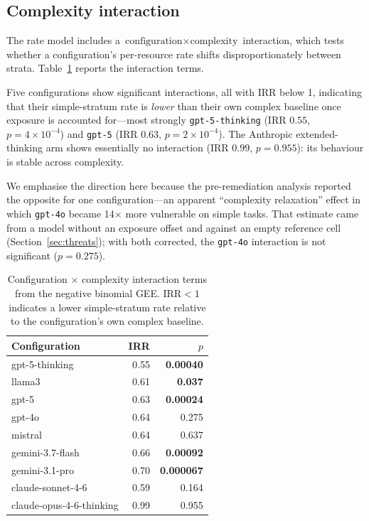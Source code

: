 \documentclass[conference]{IEEEtran}
\begin{document}
\subsection{Complexity interaction}
\label{sec:interaction}
The rate model includes a $\text{configuration}\times\text{complexity}$
interaction, which tests whether a configuration's per-resource rate shifts
disproportionately between strata. Table~\ref{tab:interaction} reports the
interaction terms.

Five configurations show significant interactions, all with IRR below 1,
indicating that their simple-stratum rate is \emph{lower} than their own complex
baseline once exposure is accounted for---most strongly \texttt{gpt-5-thinking}
(IRR $0.55$, $p=4\times10^{-4}$) and \texttt{gpt-5} (IRR $0.63$,
$p=2\times10^{-4}$). The Anthropic extended-thinking arm shows essentially no
interaction (IRR $0.99$, $p=0.955$): its behaviour is stable across complexity.

We emphasise the direction here because the pre-remediation analysis reported the
opposite for one configuration---an apparent ``complexity relaxation'' effect in
which \texttt{gpt-4o} became 14$\times$ more vulnerable on simple tasks. That
estimate came from a model without an exposure offset and against an empty
reference cell (Section~\ref{sec:threats}); with both corrected, the
\texttt{gpt-4o} interaction is not significant ($p=0.275$).

\begin{table}[t]
\caption{Configuration $\times$ complexity interaction terms from the negative
binomial GEE. IRR${<}1$ indicates a lower simple-stratum rate relative to the
configuration's own complex baseline.}
\label{tab:interaction}
\centering
\small
\begin{tabular}{@{}lrr@{}}
\toprule
Configuration & IRR & $p$ \\
\midrule
gpt-5-thinking            & 0.55 & \textbf{0.00040} \\
llama3                    & 0.61 & \textbf{0.037} \\
gpt-5                     & 0.63 & \textbf{0.00024} \\
gpt-4o                    & 0.64 & 0.275 \\
mistral                   & 0.64 & 0.637 \\
gemini-3.7-flash          & 0.66 & \textbf{0.00092} \\
gemini-3.1-pro            & 0.70 & \textbf{0.000067} \\
claude-sonnet-4-6         & 0.59 & 0.164 \\
claude-opus-4-6-thinking  & 0.99 & 0.955 \\
\bottomrule
\end{tabular}
\end{table}
\end{document}
